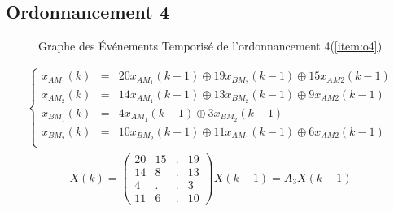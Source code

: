 \subsection{Ordonnancement 4}
\begin{figure}[!ht]
\centering
\caption{\label{fig:get} Graphe des Événements Temporisé de l'ordonnancement 4(\ref{item:o4})}
\end{figure}
\begin{align*}%
\left\lbrace
\begin{array}{lcl}
x_{AM_1}(k)&=& 20x_{AM_1}(k-1) \oplus 19x_{BM_2}(k-1) \oplus 15x_{AM2}(k-1)\\
x_{AM_2}(k)&=& 14x_{AM_1}(k-1) \oplus 13x_{BM_2}(k-1) \oplus  9x_{AM2}(k-1)\\
x_{BM_1}(k)&=&  4x_{AM_1}(k-1) \oplus  3x_{BM_2}(k-1)\\
x_{BM_2}(k)&=& 10x_{BM_2}(k-1) \oplus 11x_{AM_1}(k-1) \oplus  6x_{AM2}(k-1)\\
\end{array}
\right.
\end{align*}
\begin{align}\label{eqn::ee_Ordo4}
X(k) = \begin{pmatrix}
20&15&.&19\\
14&8&.&13\\
4&.&.&3\\
11&6&.&10
\end{pmatrix}X(k-1) = A_3X(k-1)
\end{align}